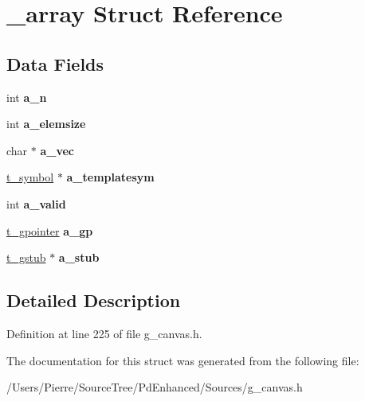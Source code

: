 \hypertarget{struct__array}{\section{\-\_\-array Struct Reference}
\label{struct__array}
}
\subsection*{Data Fields}
\begin{DoxyCompactItemize}
\item 
\hypertarget{struct__array_aa3b189ec441f48ea1be9cdb7b1adf64d}{int {\bfseries a\-\_\-n}}\label{struct__array_aa3b189ec441f48ea1be9cdb7b1adf64d}

\item 
\hypertarget{struct__array_a5b1eb235da8b1f781aea97ad3021aecb}{int {\bfseries a\-\_\-elemsize}}\label{struct__array_a5b1eb235da8b1f781aea97ad3021aecb}

\item 
\hypertarget{struct__array_afbda67f5a139b414e04a9365a0b5746e}{char $\ast$ {\bfseries a\-\_\-vec}}\label{struct__array_afbda67f5a139b414e04a9365a0b5746e}

\item 
\hypertarget{struct__array_a345ddb61991b989832af28577d807fa6}{\hyperlink{struct__symbol}{t\-\_\-symbol} $\ast$ {\bfseries a\-\_\-templatesym}}\label{struct__array_a345ddb61991b989832af28577d807fa6}

\item 
\hypertarget{struct__array_a229331467dc2c38ce0921afc4a301914}{int {\bfseries a\-\_\-valid}}\label{struct__array_a229331467dc2c38ce0921afc4a301914}

\item 
\hypertarget{struct__array_a9e2dcfc5183eddad2b3b0cdee0a91f95}{\hyperlink{struct__gpointer}{t\-\_\-gpointer} {\bfseries a\-\_\-gp}}\label{struct__array_a9e2dcfc5183eddad2b3b0cdee0a91f95}

\item 
\hypertarget{struct__array_ad26c9c487b30b46f6990a614dbf71d31}{\hyperlink{struct__gstub}{t\-\_\-gstub} $\ast$ {\bfseries a\-\_\-stub}}\label{struct__array_ad26c9c487b30b46f6990a614dbf71d31}

\end{DoxyCompactItemize}


\subsection{Detailed Description}


Definition at line 225 of file g\-\_\-canvas.\-h.



The documentation for this struct was generated from the following file\-:\begin{DoxyCompactItemize}
\item 
/\-Users/\-Pierre/\-Source\-Tree/\-Pd\-Enhanced/\-Sources/g\-\_\-canvas.\-h\end{DoxyCompactItemize}
